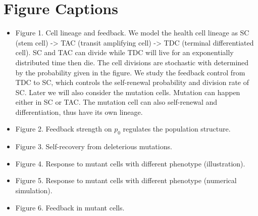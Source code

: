 \documentclass[12pt]{article}
\newtheorem{remark}{Remark}
\begin{document}




\section*{Figure Captions}
\begin{itemize}
\item 
Figure 1. Cell lineage and feedback. We model the health cell lineage
as SC (stem cell) -> TAC (transit amplifying cell) -> TDC (terminal
differentiated cell). SC and TAC can divide while TDC will live for
an exponentially distributed time then die. The cell divisions are 
stochastic with determined by the probability given in the figure.
We study the feedback control from TDC to SC, which controls the 
self-renewal probability and division rate of SC. Later we will 
also consider the mutation cells. Mutation can happen either in SC
or TAC. The mutation cell can also self-renewal and differentiation, 
thus have its own lineage.

\item 
Figure 2. Feedback strength on $p_0$ regulates 
the population structure.

\item
Figure 3. Self-recovery from deleterious mutations. 

\item
Figure 4. Response to mutant cells with different phenotype (illustration).

\item
Figure 5. Response to mutant cells with different phenotype 
(numerical simulation).

\item
Figure 6. Feedback in mutant cells.
\end{itemize}
\end{document}
